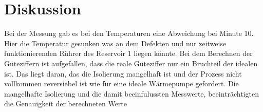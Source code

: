 \section{Diskussion}
\label{sec:Diskussion}
Bei der Messung gab es bei den Temperaturen eine Abweichung bei Minute 10. Hier
die Temperatur gesunken was an dem Defekten und nur zeitweise funktionierenden
Rührer des Reservoir 1 liegen könnte. Bei dem Berechnen der Güteziffern ist
aufgefallen, dass die reale Güteziffer nur ein Bruchteil der idealen ist. Das
liegt daran, das die Isolierung mangelhaft ist und der Prozess nicht vollkommen
reversiebel ist wie für eine ideale Wärmepumpe gefordert. Die mangelhafte
Isolierung und die damit beeinfulussten Messwerte, beeinträchtigten die
Genauigkeit der berechneten Werte
